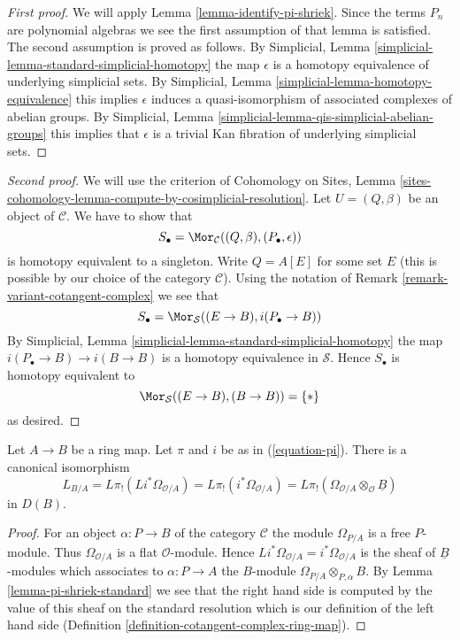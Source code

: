 \begin{proof}[First proof]
We will apply Lemma \ref{lemma-identify-pi-shriek}.
Since the terms $P_n$ are polynomial algebras we see the first
assumption of that lemma is satisfied. The second assumption is proved
as follows. By
Simplicial, Lemma \ref{simplicial-lemma-standard-simplicial-homotopy}
the map $\epsilon$ is a homotopy equivalence of underlying
simplicial sets. By
Simplicial, Lemma \ref{simplicial-lemma-homotopy-equivalence}
this implies $\epsilon$ induces a quasi-isomorphism of associated
complexes of abelian groups. By
Simplicial, Lemma \ref{simplicial-lemma-qis-simplicial-abelian-groups}
this implies that $\epsilon$ is a trivial Kan fibration of underlying
simplicial sets.
\end{proof}

\begin{proof}[Second proof]
We will use the criterion of Cohomology on Sites, Lemma
\ref{sites-cohomology-lemma-compute-by-cosimplicial-resolution}.
Let $U = (Q, \beta)$ be an object of $\mathcal{C}$.
We have to show that
$$
S_\bullet = \Mor_\mathcal{C}((Q, \beta), (P_\bullet, \epsilon))
$$
is homotopy equivalent to a singleton. Write $Q = A[E]$ for some set $E$
(this is possible by our choice of the category $\mathcal{C}$). Using the
notation of Remark \ref{remark-variant-cotangent-complex} we see that
$$
S_\bullet = \Mor_\mathcal{S}((E \to B), i(P_\bullet \to B))
$$
By Simplicial, Lemma \ref{simplicial-lemma-standard-simplicial-homotopy}
the map $i(P_\bullet \to B) \to i(B \to B)$ is a homotopy equivalence
in $\mathcal{S}$. Hence $S_\bullet$ is homotopy equivalent to
$$
\Mor_\mathcal{S}((E \to B), (B \to B)) = \{*\}
$$
as desired.
\end{proof}

\begin{lemma}
\label{lemma-compute-cotangent-complex}
Let $A \to B$ be a ring map.  Let $\pi$ and $i$ be as in (\ref{equation-pi}).
There is a canonical isomorphism
$$
L_{B/A} = L\pi_!(Li^*\Omega_{\mathcal{O}/A}) =
L\pi_!(i^*\Omega_{\mathcal{O}/A}) =
L\pi_!(\Omega_{\mathcal{O}/A} \otimes_\mathcal{O} \underline{B})
$$
in $D(B)$.
\end{lemma}

\begin{proof}
For an object $\alpha : P \to B$ of the category $\mathcal{C}$
the module $\Omega_{P/A}$ is a free $P$-module. Thus
$\Omega_{\mathcal{O}/A}$ is a flat $\mathcal{O}$-module. Hence
$Li^*\Omega_{\mathcal{O}/A} = i^*\Omega_{\mathcal{O}/A}$ is the sheaf
of $\underline{B}$-modules which associates to $\alpha : P \to A$ the
$B$-module $\Omega_{P/A} \otimes_{P, \alpha} B$.
By Lemma \ref{lemma-pi-shriek-standard}
we see that the right hand side is computed by
the value of this sheaf on the standard resolution which is our
definition of the left hand side
(Definition \ref{definition-cotangent-complex-ring-map}).
\end{proof}


